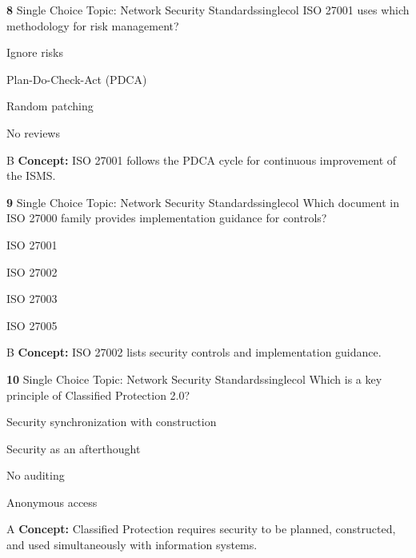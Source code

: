 \documentclass[10pt,a4paper]{article}
\begin{document}
\begin{qcard}{\color{white}\textbf{8} \hfill \small Single Choice \textbar{} Topic: Network Security Standards}{singlecol}
ISO 27001 uses which methodology for risk management?

\begin{qoptions}
\item Ignore risks
\item Plan-Do-Check-Act (PDCA)
\item Random patching
\item No reviews
\end{qoptions}
\begin{explainbox}{B}
\textbf{Concept:} ISO 27001 follows the PDCA cycle for continuous improvement of the ISMS.
\end{explainbox}
\end{qcard}

\begin{qcard}{\color{white}\textbf{9} \hfill \small Single Choice \textbar{} Topic: Network Security Standards}{singlecol}
Which document in ISO 27000 family provides implementation guidance for controls?

\begin{qoptions}
\item ISO 27001
\item ISO 27002
\item ISO 27003
\item ISO 27005
\end{qoptions}
\begin{explainbox}{B}
\textbf{Concept:} ISO 27002 lists security controls and implementation guidance.
\end{explainbox}
\end{qcard}

\begin{qcard}{\color{white}\textbf{10} \hfill \small Single Choice \textbar{} Topic: Network Security Standards}{singlecol}
Which is a key principle of Classified Protection 2.0?

\begin{qoptions}
\item Security synchronization with construction
\item Security as an afterthought
\item No auditing
\item Anonymous access
\end{qoptions}
\begin{explainbox}{A}
\textbf{Concept:} Classified Protection requires security to be planned, constructed, and used simultaneously with information systems.
\end{explainbox}
\end{qcard}
\end{document}

